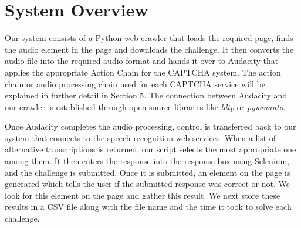 \section{System Overview}
\label{sec:design}
Our system consists of a Python web crawler that loads the required page, finds the audio element in the page and downloads the challenge. It then converts the audio file into the required audio format and hands it over to Audacity that applies the appropriate Action Chain for the CAPTCHA system. The action chain or audio processing chain used for each CAPTCHA service will be explained in further detail in Section 5. The connection between Audacity and our crawler is established through open-source libraries like \textit{ldtp} or \textit{pywinauto}. \newline

Once Audacity completes the audio processing, control is transferred back to our system that connects to the speech recognition web services. When a list of alternative transcriptions is returned, our script selects the most appropriate one among them. It then enters the response into the response box using Selenium, and the challenge is submitted. Once it is submitted, an element on the page is generated which tells the user if the submitted response was correct or not. We look for this element on the page and gather this result. We next store these results in a CSV file along with the file name and the time it took to solve each challenge. \newline
